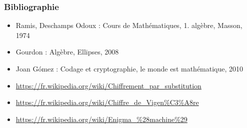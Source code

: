 \documentclass[french]{beamer}
\begin{document}
\begin{frame}
  \frametitle{Bibliographie}
%  
  \begin{itemize}
    \item Ramis, Deschamps Odoux : Cours de Mathématiques, 1. algèbre,
      Masson, 1974
    \item Gourdon : Algèbre, Ellipses, 2008
    \item Joan G\'omez : Codage et cryptographie, le monde est
      mathématique, 2010
    \item
      \url{https://fr.wikipedia.org/wiki/Chiffrement_par_substitution}
    \item \url{https://fr.wikipedia.org/wiki/Chiffre_de_Vigen\%C3\%A8re}
    \item \url{https://fr.wikipedia.org/wiki/Enigma_\%28machine\%29}
  \end{itemize}
\end{frame}
\end{document}
